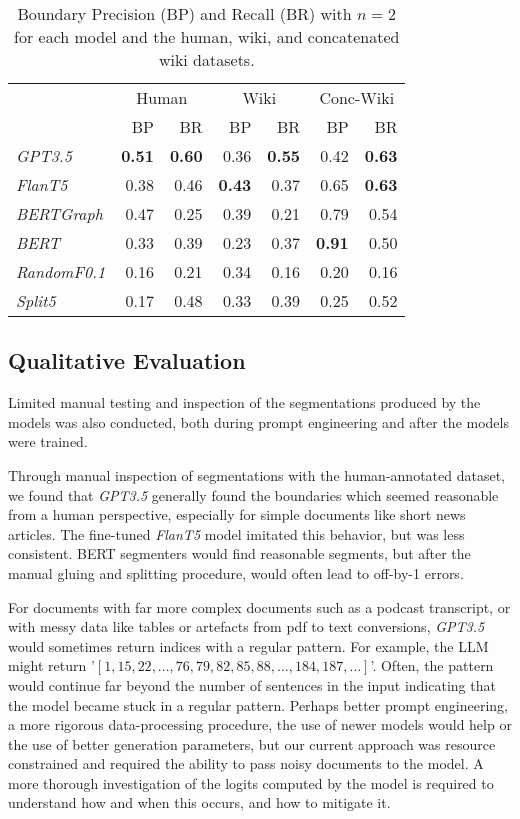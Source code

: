 \begin{table}[ht]
    \centering
    \begin{tabular}{@{}lrrrrrr@{}}
    \toprule
    & \multicolumn{2}{c}{Human} & \multicolumn{2}{c}{Wiki} & \multicolumn{2}{c}{Conc-Wiki} \\
    & BP & BR & BP & BR & BP & BR \\
    \midrule
    \it GPT3.5 & \bf 0.51 & \bf 0.60 & 0.36 & \bf 0.55 & 0.42 & \bf 0.63 \\
    \it FlanT5 & 0.38 & 0.46 & \bf 0.43 & 0.37 & 0.65 & \bf 0.63 \\
    \midrule
    \it BERTGraph & 0.47 & 0.25 & 0.39 & 0.21 & 0.79 & 0.54 \\
    \it BERT & 0.33 & 0.39 & 0.23 & 0.37 & \bf 0.91 & 0.50 \\
    \it RandomF0.1 & 0.16 & 0.21 & 0.34 & 0.16 & 0.20 & 0.16 \\
    \it Split5 & 0.17 & 0.48 & 0.33 & 0.39 & 0.25 & 0.52 \\
    \bottomrule
    \end{tabular}
    \caption{Boundary Precision (BP) and Recall (BR) with $n=2$ for each model and the human, wiki, and concatenated wiki datasets.}\label{tab:quant_results_precision_recall}
   
\end{table}
    

\subsection{Qualitative Evaluation}

Limited manual testing and inspection of the segmentations produced by the models was also conducted, both during prompt engineering and after the models were trained.

Through manual inspection of segmentations with the human-annotated dataset, we found that \emph{GPT3.5} generally found the boundaries which seemed reasonable from a human perspective, especially for simple documents like short news articles. The fine-tuned \emph{FlanT5} model imitated this behavior, but was less consistent. BERT segmenters would find reasonable segments, but after the manual gluing and splitting procedure, would often lead to off-by-1 errors.

For documents with far more complex documents such as a podcast transcript, or with messy data like tables or artefacts from pdf to text conversions, \emph{GPT3.5} would sometimes return indices with a regular pattern. For example, the LLM might return '$[1,15,22, \ldots, 76, 79, 82, 85, 88, \ldots, 184, 187, \ldots]$'. Often, the pattern would continue far beyond the number of sentences in the input indicating that the model became stuck in a regular pattern. Perhaps better prompt engineering, a more rigorous data-processing procedure, the use of newer models would help or the use of better generation parameters, but our current approach was resource constrained and required the ability to pass noisy documents to the model. A more thorough investigation of the logits computed by the model is required to understand how and when this occurs, and how to mitigate it.